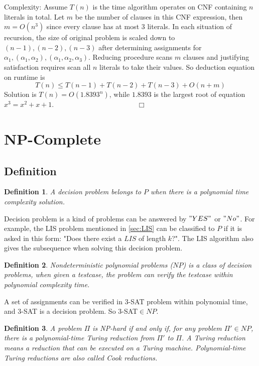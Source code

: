 \documentclass[11pt,twoside, onecolumn]{IEEEtran}
\newtheorem{Definition}{Definition}[section]
\begin{document}
Complexity: Assume $T(n)$ is the time algorithm operates on CNF containing $n$ literals in total.
Let $m$ be the number of clauses in this CNF expression, then $m = O(n^3)$ since every clause
has at most $3$ literals. In each situation of recursion, the size of original problem is
scaled down to $(n-1), (n-2), (n-3)$ after determining assignments for $\alpha_1,(\alpha_1,\alpha_2),(\alpha_1,\alpha_2,\alpha_3)$. Reducing procedure scans $m$ clauses and justifying satisfaction requires 
scan all $n$ literals to take their values. So deduction equation on runtime is
$$T(n) \leq T(n-1) + T(n-2) + T(n-3) + O(n+m)$$
Solution is $T(n) = O(1.8393^n)$, while $1.8393$ is the largest root of equation $x^3 = x^2 + x + 1$. \ \ \ \ \ \ \ \ \ \ \ \ \ \ \ \ \ \ \ \ \ \ \ $\Box$

\section{NP-Complete}
\subsection{Definition}
\begin{Definition}
A decision problem belongs to $P$ when there is a polynomial time complexity solution.
\end{Definition}

Decision problem is a kind of problems can be answered by $"YES"$ or $"No"$. For example, the LIS problem
mentioned in \ref{sec:LIS} can be classified to $P$ if it is asked in this form: "Does there exist a $LIS$ of
length $k$?". The LIS algorithm also gives the subsequence when solving this decision problem.

\begin{Definition}
Nondeterministic polynomial problems ($NP$) is a class of decision problems, when given a testcase,
the problem can verify the testcase within polynomial complexity time.
\end{Definition}

A set of assignments can be verified in 3-SAT problem within polynomial time, and 3-SAT is a decision
problem. So 3-SAT$\in NP$. 

\begin{Definition}
\label{def:nphard}
A problem $\Pi$ is \emph{NP-hard} if and only if, for any problem $\Pi' \in NP$, there is a polynomial-time Turing reduction
from $\Pi'$ to $\Pi$. A Turing reduction means a reduction that can be executed on a Turing machine. Polynomial-time Turing reductions are also called \emph{Cook reductions}.
\end{Definition}
\end{document}
